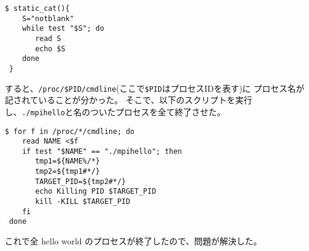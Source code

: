 \documentclass[a4j,10pt]{jarticle}
\begin{document}
\begin{addmargin}[1.5em]{2em}\begin{verbatim}
$ static_cat(){
    S="notblank"
    while test "$S"; do
       read S
       echo $S
    done
 }
\end{verbatim}\end{addmargin}
\noindent
すると、\texttt{/proc/\$PID/cmdline}(ここで\texttt{\$PID}はプロセスIDを表す)に
プロセス名が記されていることが分かった。
そこで、以下のスクリプトを実行し、\texttt{./mpihello}と名のついたプロセスを全て終了させた。
\begin{addmargin}[1.5em]{2em}\begin{verbatim}
$ for f in /proc/*/cmdline; do
    read NAME <$f
    if test "$NAME" == "./mpihello"; then
       tmp1=${NAME%/*}
       tmp2=${tmp1#*/}
       TARGET_PID=${tmp2#*/}
       echo Killing PID $TARGET_PID
       kill -KILL $TARGET_PID
    fi
 done
\end{verbatim}\end{addmargin}

これで全 hello world のプロセスが終了したので、問題が解決した。
\end{document}
